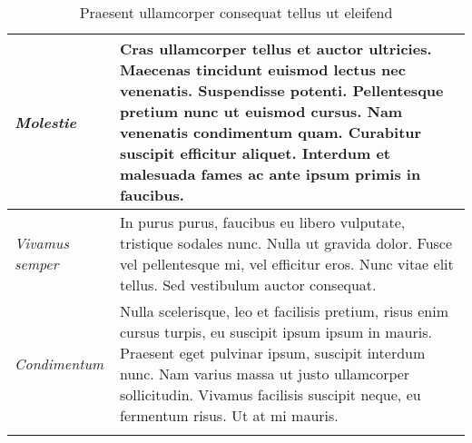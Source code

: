 \begin{center}
\begin{longtable}{ | p{} | p{} | }
		\emph{Molestie}
		& Cras ullamcorper tellus et auctor ultricies. Maecenas tincidunt euismod lectus nec venenatis. Suspendisse potenti. Pellentesque pretium nunc ut euismod cursus. Nam venenatis condimentum quam. Curabitur suscipit efficitur aliquet. Interdum et malesuada fames ac ante ipsum primis in faucibus.
		\\ \hline
		
		\emph{Vivamus semper}
		& In purus purus, faucibus eu libero vulputate, tristique sodales nunc. Nulla ut gravida dolor. Fusce vel pellentesque mi, vel efficitur eros. Nunc vitae elit tellus. Sed vestibulum auctor consequat. 
		\\ \hline
		
		\emph{Condimentum}
		& Nulla scelerisque, leo et facilisis pretium, risus enim cursus turpis, eu suscipit ipsum ipsum in mauris. Praesent eget pulvinar ipsum, suscipit interdum nunc. Nam varius massa ut justo ullamcorper sollicitudin. Vivamus facilisis suscipit neque, eu fermentum risus. Ut at mi mauris.
		\\ \hline
		
		\caption{Praesent ullamcorper consequat tellus ut eleifend}
		\label{tab:example-3}		
	\end{longtable}
\end{center}